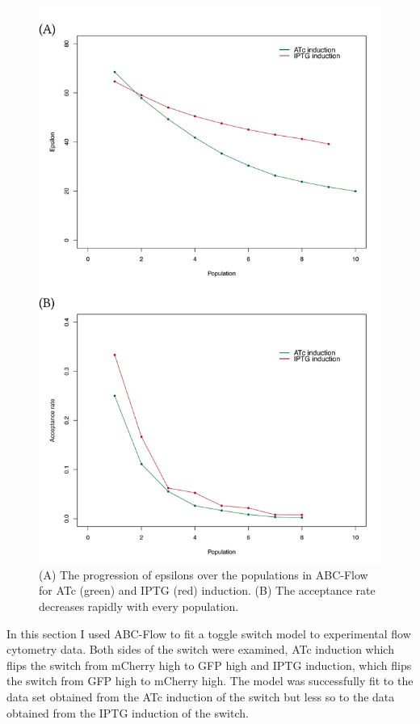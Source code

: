 \begin{figure}[tb]
\centerfloat
	\includegraphics[scale=0.7]{../../chapters/chapterABCFlow/images/epsilon_acceptance.png}
	\caption[Epsilon and acceptance rate of ABC-Flow inference]{\label{fig:epsilon_accept}(A) The progression of epsilons over the populations in ABC-Flow for ATc (green) and IPTG (red) induction. (B) The acceptance rate decreases rapidly with every population.}
\end{figure}

In this section I used ABC-Flow to fit a toggle switch model to experimental flow cytometry data. Both sides of the switch were examined, ATc induction which flips the switch from mCherry high to GFP high and IPTG induction, which flips the switch from GFP high to mCherry high. The model was successfully fit to the data set obtained from the ATc induction of the switch but less so to the data obtained from the IPTG induction of the switch. 

